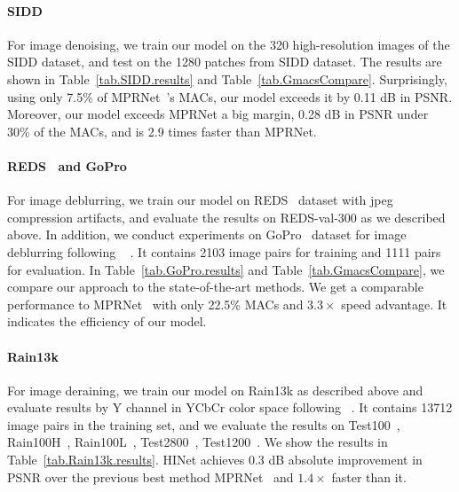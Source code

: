 \documentclass[final]{cvpr}
\begin{document}
\paragraph{SIDD~\cite{abdelhamed2018high}} For image denoising, we train our model on the 320 high-resolution images of the SIDD dataset, and test on the 1280 patches from SIDD dataset. The results are shown in Table~\ref{tab.SIDD.results} and Table~\ref{tab.GmacsCompare}. Surprisingly, using only 7.5\% of MPRNet~\cite{Zamir2021MPRNet}'s MACs, our model exceeds it by 0.11 dB in PSNR. Moreover, our model exceeds MPRNet a big margin, 0.28 dB in PSNR under 30\% of the MACs, and is 2.9 times faster than MPRNet.


\paragraph{REDS~\cite{nah2019ntire} and GoPro~\cite{nah2017deep}} For image deblurring, we train our model on REDS~\cite{nah2019ntire} dataset with jpeg compression artifacts, and evaluate the results on REDS-val-300 as we described above. In addition, we conduct experiments on GoPro~\cite{nah2017deep} dataset for image deblurring following ~\cite{Zamir2021MPRNet,Zhang_2019_CVPR} \etc. It contains 2103 image pairs for training and 1111 pairs for evaluation. In Table~\ref{tab.GoPro.results} and Table~\ref{tab.GmacsCompare}, we compare our approach to the state-of-the-art methods. We get a comparable performance to MPRNet~\cite{Zamir2021MPRNet} with only 22.5\% MACs and $3.3\times$ speed advantage. It indicates the efficiency of our model. 

\paragraph{Rain13k} For image deraining, we train our model on Rain13k as described above and evaluate results by Y channel in YCbCr color space following ~\cite{jiang2020multi,Zamir2021MPRNet}. It contains 13712 image pairs in the training set, and we evaluate the results on Test100~\cite{zhang2019image}, Rain100H~\cite{yang2017deep}, Rain100L~\cite{yang2017deep}, Test2800~\cite{fu2017removing}, Test1200~\cite{zhang2018density}. We show the results in Table~\ref{tab.Rain13k.results}. HINet achieves 0.3 dB absolute improvement in PSNR over the previous best method MPRNet~\cite{Zamir2021MPRNet} and $1.4\times$ faster than it.
\end{document}
